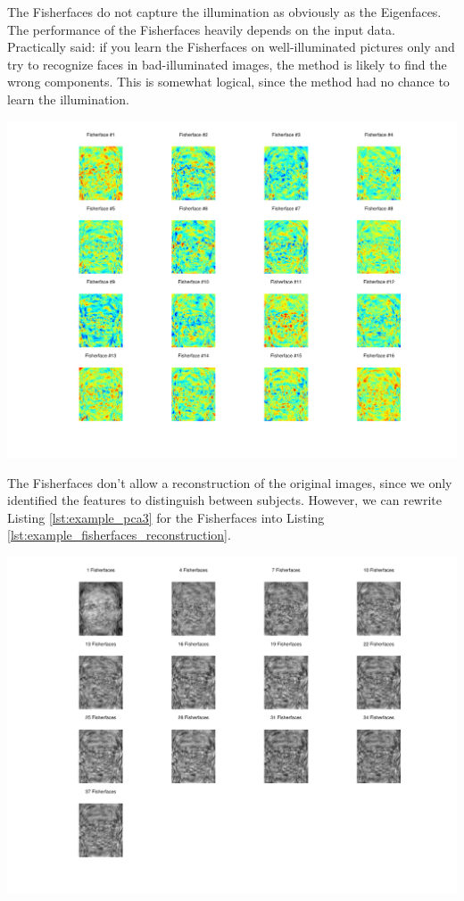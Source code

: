

The Fisherfaces do not capture the illumination as obviously as the Eigenfaces. The performance of the Fisherfaces heavily depends on the input data. Practically said: if you learn the Fisherfaces on well-illuminated pictures only and try to recognize faces in bad-illuminated images, the method is likely to find the wrong components. This is somewhat logical, since the method had no chance to learn the illumination.

\begin{center}
	\includegraphics[scale=0.6]{img/fisherfaces/fisherfaces_fisherfaces}
\end{center}

The Fisherfaces don't allow a reconstruction of the original images, since we only identified the features to distinguish between subjects. However, we can rewrite Listing \ref{lst:example_pca3} for the Fisherfaces into Listing \ref{lst:example_fisherfaces_reconstruction}.



\begin{center}
	\includegraphics[scale=0.6]{img/fisherfaces/fisherfaces_reconstruction}
\end{center}
